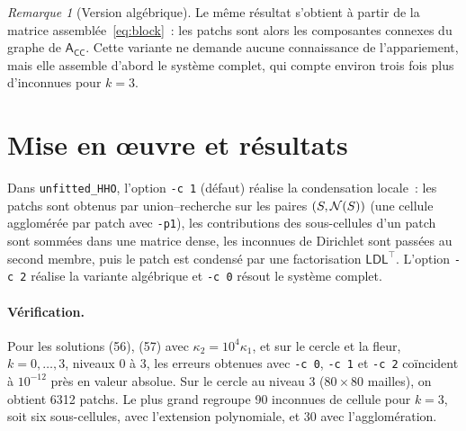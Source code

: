 \documentclass[11pt,a4paper]{article}
\theoremstyle{definition}
\theoremstyle{remark}
\newtheorem{remark}{Remarque}
\newcommand{\A}{\mathsf{A}}
\begin{document}
\begin{remark}[Version algébrique]
Le même résultat s'obtient à partir de la matrice assemblée~\eqref{eq:block}~: les patchs sont alors
les composantes connexes du graphe de $\A_{\mathsf{CC}}$. Cette variante ne demande aucune
connaissance de l'appariement, mais elle assemble d'abord le système complet, qui compte environ
trois fois plus d'inconnues pour $k=3$.
\end{remark}

\section{Mise en \oe uvre et résultats}

Dans \texttt{unfitted\_HHO}, l'option \texttt{-c 1} (défaut) réalise la condensation locale~:
les patchs sont obtenus par union--recherche sur les paires $(S,\mathcal{N}(S))$ (une cellule agglomérée par
patch avec \texttt{-p1}), les contributions des sous-cellules d'un patch sont sommées dans une matrice
dense, les inconnues de Dirichlet sont passées au second membre, puis le patch est condensé par une
factorisation $\mathsf{LDL}^\top$. L'option \texttt{-c 2} réalise la variante algébrique et
\texttt{-c 0} résout le système complet.

\paragraph{Vérification.} Pour les solutions (56), (57) avec $\kappa_2=10^4\kappa_1$, et sur le cercle
et la fleur, $k=0,\dots,3$, niveaux $0$ à $3$, les erreurs obtenues avec \texttt{-c 0}, \texttt{-c 1}
et \texttt{-c 2} coïncident à $10^{-12}$ près en valeur absolue. Sur le cercle au niveau 3
($80\times80$ mailles), on obtient 6312 patchs. Le plus grand regroupe 90 inconnues de cellule pour
$k=3$, soit six sous-cellules, avec l'extension polynomiale, et 30 avec l'agglomération.
\end{document}
